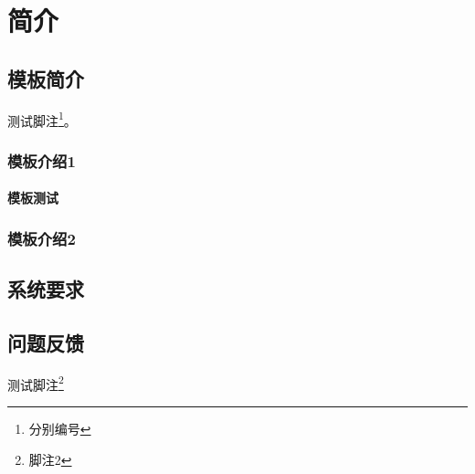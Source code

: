 \chapter{简介}
\section{模板简介}
测试脚注\footnote{分别编号}。

\subsection{模板介绍1}

\subsubsection{模板测试}

\subsection{模板介绍2}

\section{系统要求}

\section{问题反馈}
测试脚注\footnote{脚注2}
